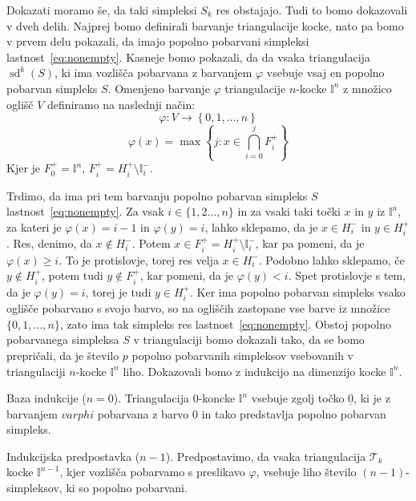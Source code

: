 \documentclass[mat1]{fmfdelo}
\DeclareMathOperator{\sd}{sd}
\newcommand{\I}{\mathbb I}
\newcommand{\0}{\underline{0}}
\newcommand{\pT}{\mathcal T}
\begin{document}
\begin{dokaz}
Dokazati moramo še, da taki simpleksi $S_k$ res obstajajo. Tudi to bomo dokazovali v dveh delih. Najprej bomo definirali barvanje triangulacije kocke, nato pa bomo v prvem delu pokazali, da imajo popolno pobarvani simpleksi lastnost~\eqref{eq:nonempty}. Kasneje bomo pokazali, da da vsaka triangulacija $\sd^k(S)$, ki ima vozlišča pobarvana z barvanjem $\varphi$ vsebuje vsaj en popolno pobarvan simpleks $S$.
Omenjeno barvanje $\varphi$ triangulacije $n$-kocke $\I^n$ z množico oglišč $V$ definiramo na naslednji način:
$$\varphi : V \to \left \{ 0, 1, \dots, n \right \}$$
$$\varphi(x) = \max \left \{ j : x \in \bigcap_{i=0}^j F_i^+\right \}$$
Kjer je $ F_0^+ = \I^n$, $ F_i^+ =  H_i^+ \setminus \I_i^-$.

Trdimo, da ima pri tem barvanju popolno pobarvan simpleks $S$ lastnost~\eqref{eq:nonempty}. 
Za vsak $i \in \{1, 2 \dots, n \}$ in za vsaki taki točki $x$ in $y$ iz $\I^n$, za kateri je $\varphi(x) = i - 1$ in $\varphi(y) = i$, lahko sklepamo, da je $x \in H_{i}^-$ in $y \in H_i^+$. Res, denimo, da $x \notin H_{i}^-$. Potem $x \in F_i^+ = H_{i}^+ \setminus \I_i^-$, kar pa pomeni, da je $\varphi(x) \geq i$. To je protislovje, torej res velja $x \in H_{i}^-$. Podobno lahko sklepamo, če $y \notin H_i^+$, potem tudi $y \notin F_i^+$, kar pomeni, da je $\varphi(y) < i$. Spet protislovje s tem, da je $\varphi(y) = i$, torej je tudi $y \in H_i^+$.
Ker ima popolno pobarvan simpleks vsako oglišče pobarvano s svojo barvo, so na ogliščih zastopane vse barve iz množice $\{ 0, 1, \dots, n \}$, zato ima tak simpleks res lastnost~\eqref{eq:nonempty}. 
Obstoj popolno pobarvanega simpleksa $S$ v triangulaciji bomo dokazali tako, da se bomo prepričali, da je število $p$ popolno pobarvanih simpleksov vsebovanih v triangulaciji $n$-kocke $\I^n$ liho. Dokazovali bomo z indukcijo na dimenzijo kocke $\I^n$.

Baza indukcije ($n = 0$).
Triangulacija $0$-koncke $\I^n$ vsebuje zgolj točko $\0$, ki je z barvanjem $varphi$ pobarvana z barvo $0$ in tako predstavlja popolno pobarvan simpleks.

Indukcijska predpostavka ($n - 1$).
Predpostavimo, da vsaka triangulacija $\pT_k$ kocke $\I^{n-1}$, kjer vozlišča pobarvamo s preslikavo $\varphi$, vsebuje liho število $(n - 1)$-simpleksov, ki so popolno pobarvani.


\end{dokaz}
\end{document}

